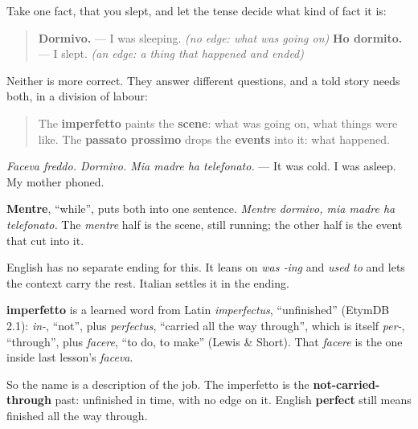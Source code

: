 \begin{grammarlens}[title={Grammar Lens: the scene and the events}]
Take one fact, that you slept, and let the tense decide what kind of fact it is:

\begin{quote}
\textbf{Dormivo.} — I was sleeping. \emph{(no edge: what was going on)} \textbf{Ho dormito.} — I slept. \emph{(an edge: a thing that happened and ended)}
\end{quote}

Neither is more correct. They answer different questions, and a told story needs both, in a division of labour:

\begin{quote}
The \textbf{imperfetto} paints the \textbf{scene}: what was going on, what things were like. The \textbf{passato prossimo} drops the \textbf{events} into it: what happened.
\end{quote}

\emph{Faceva freddo. Dormivo. Mia madre ha telefonato.} — It was cold. I was asleep. My mother phoned.

\textbf{Mentre}, \textquotedblleft{}while\textquotedblright{}, puts both into one sentence. \emph{Mentre dormivo, mia madre ha telefonato.} The \emph{mentre} half is the scene, still running; the other half is the event that cut into it.

English has no separate ending for this. It leans on \emph{was ‑ing} and \emph{used to} and lets the context carry the rest. Italian settles it in the ending.
\end{grammarlens}

\begin{cousinweb}
\textbf{imperfetto} is a learned word from Latin \emph{imperfectus}, \textquotedblleft{}unfinished\textquotedblright{} (EtymDB 2.1): \emph{in-}, \textquotedblleft{}not\textquotedblright{}, plus \emph{perfectus}, \textquotedblleft{}carried all the way through\textquotedblright{}, which is itself \emph{per-}, \textquotedblleft{}through\textquotedblright{}, plus \emph{facere}, \textquotedblleft{}to do, to make\textquotedblright{} (Lewis \& Short). That \emph{facere} is the one inside last lesson's \emph{faceva}.

So the name is a description of the job. The imperfetto is the \textbf{not-carried-through} past: unfinished in time, with no edge on it. English \textbf{perfect} still means finished all the way through.
\end{cousinweb}

